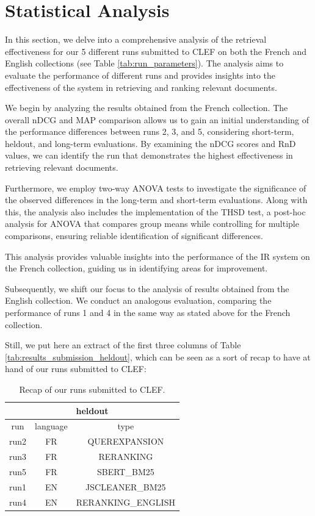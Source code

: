 \section{Statistical Analysis}
\label{sec:analysis}

In this section, we delve into a comprehensive analysis of the retrieval effectiveness for our 5 different runs submitted to \ac{CLEF} on both the French and English collections (see Table \ref{tab:run_parameters}). 
The analysis aims to evaluate the performance of different runs and provides insights into the effectiveness of the system in retrieving and ranking relevant documents.

We begin by analyzing the results obtained from the French collection. 
The overall \ac{nDCG} and \ac{MAP} comparison allows us to gain an initial understanding of the performance differences between runs 2, 3, and 5, considering short-term, heldout, and long-term evaluations. 
By examining the \ac{nDCG} scores and \ac{RnD} values, we can identify the run that demonstrates the highest effectiveness in retrieving relevant documents.

Furthermore, we employ two-way \ac{ANOVA} tests to investigate the significance of the observed differences in the long-term and short-term evaluations.
Along with this, the analysis also includes the implementation of the \acl{THSD} test, a post-hoc analysis for \ac{ANOVA} that compares group means while controlling for multiple comparisons, ensuring reliable identification of significant differences.

This analysis provides valuable insights into the performance of the \ac{IR} system on the French collection, guiding us in identifying areas for improvement.

Subsequently, we shift our focus to the analysis of results obtained from the English collection. 
We conduct an analogous evaluation, comparing the performance of runs 1 and 4 in the same way as stated above for the French collection. 

Still, we put here an extract of the first three columns of Table \ref{tab:results_submission_heldout}, which can be seen as a sort of recap to have at hand of our runs submitted to \ac{CLEF}:

\begin{table}[!h]
    \centering
    \begin{tabular}{ |c|c|c| }
        \hline
        \hline
        \multicolumn{3}{|c|}{heldout} \\ \hline
        run  & language & type \\ \hline
        run2 &   FR   & QUEREXPANSION \\
        run3 &   FR   & RERANKING \\
        run5 &   FR   & SBERT\_BM25 \\
        \hline
        run1 &   EN   & JSCLEANER\_BM25 \\
        run4 &   EN   & RERANKING\_ENGLISH \\
        \hline
    \end{tabular}
    \caption{Recap of our runs submitted to \ac{CLEF}.}
    \label{tab:runs_recap}
\end{table}


